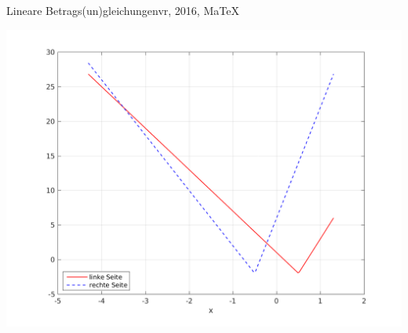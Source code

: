 \begin{MAufgabe}{Lineare Betrags(un)gleichungen}{vr, 2016, MaTeX}
 \begin{center}
 \includegraphics[width=0.8\linewidth]{Abb_zur_Ag_autogenerated_abs_9.png} \end{center}
 
\else\relax\fi
 \end{MAufgabe}
